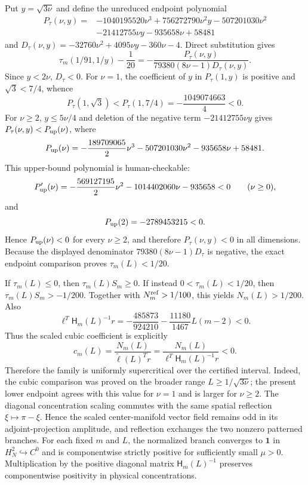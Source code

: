 \documentclass[10pt]{article}
\newcommand{\1}{\mathbf1}
\begin{document}
Put $y=\sqrt{3\nu}$ and define the unreduced endpoint polynomial
\begin{align*}
 P_\tau(\nu,y)={}&-1040195520\nu^3+756272790\nu^2y
 -507201030\nu^2\\
 &-21412755\nu y-935658\nu+58481
\end{align*}
and $D_\tau(\nu,y)=-32760\nu^2+4095\nu y-360\nu-4$.  Direct
substitution gives
\[
 \tau_m(1/91,1/y)-\frac1{20}
 =-\frac{P_\tau(\nu,y)}{79380(8\nu-1)D_\tau(\nu,y)}.
\]
Since $y<2\nu$, $D_\tau<0$.  For $\nu=1$, the coefficient of $y$ in
$P_\tau(1,y)$ is positive and $\sqrt3<7/4$, whence
\[
 P_\tau(1,\sqrt3)<P_\tau(1,7/4)=-\frac{1049074663}{4}<0.
\]
For $\nu\ge2$, $y\le5\nu/4$ and deletion of the negative term
$-21412755\nu y$ gives $P_\tau(\nu,y)<P_{\rm up}(\nu)$, where
\[
 P_{\rm up}(\nu)=-\frac{189709065}{2}\nu^3-507201030\nu^2
 -935658\nu+58481.
\]
This upper-bound polynomial is human-checkable:
\[
 P_{\rm up}'(\nu)=-\frac{569127195}{2}\nu^2-1014402060\nu-935658<0
 \qquad(\nu\ge0),
\]
and
\[
 P_{\rm up}(2)=-2789453215<0.
\]
Hence $P_{\rm up}(\nu)<0$ for every $\nu\ge2$, and therefore
$P_\tau(\nu,y)<0$ in all dimensions.  Because the displayed denominator
$79380(8\nu-1)D_\tau$ is negative, the exact endpoint comparison proves
$\tau_m(L)<1/20$.

If $\tau_m(L)\le0$, then $\tau_m(L)S_m\ge0$.  If instead
$0<\tau_m(L)<1/20$, then $\tau_m(L)S_m>-1/200$.  Together with
$N_m^{\rm ref}>1/100$, this yields $N_m(L)>1/200$.  Also
\[
 \ell^T\mathsf H_m(L)^{-1}r=-\frac{485873}{924210}
 -\frac{11180}{1467}L(m-2)<0.
\]
Thus the scaled cubic coefficient is explicitly
\[
 c_m(L)=\frac{N_m(L)}{\widetilde\ell(L)^Tr}
 =\frac{N_m(L)}{\ell^T\mathsf H_m(L)^{-1}r}<0.
\]
Therefore the family is uniformly supercritical over the certified interval.
Indeed, the cubic comparison was proved on the broader range
$L\ge1/\sqrt{3\nu}$; the present lower endpoint agrees with this value for
$\nu=1$ and is larger for $\nu\ge2$.
The diagonal concentration scaling commutes with the same spatial reflection
$\xi\mapsto\pi-\xi$.  Hence the scaled center-manifold vector field remains
odd in its adjoint-projection amplitude, and reflection exchanges the two
nonzero patterned branches.
For each fixed $m$ and $L$, the normalized branch converges to $\1$ in
$H_N^2\hookrightarrow C^0$ and is componentwise strictly positive for
sufficiently small $\mu>0$.  Multiplication by the positive diagonal matrix
$\mathsf H_m(L)^{-1}$ preserves componentwise positivity in physical
concentrations.
\end{document}
